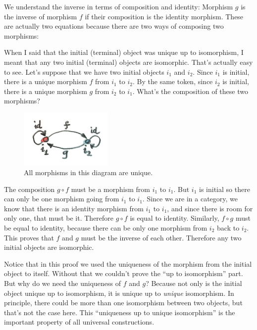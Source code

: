 We understand the inverse in terms of composition and identity: Morphism
$g$ is the inverse of morphism $f$ if their composition is the
identity morphism. These are actually two equations because there are
two ways of composing two morphisms:

When I said that the initial (terminal) object was unique up to
isomorphism, I meant that any two initial (terminal) objects are
isomorphic. That's actually easy to see. Let's suppose that we have two
initial objects $i_{1}$ and $i_{2}$. Since
$i_{1}$ is initial, there is a unique morphism $f$ from
$i_{1}$ to $i_{2}$. By the same token, since
$i_{2}$ is initial, there is a unique morphism $g$ from
$i_{2}$ to $i_{1}$. What's the composition of
these two morphisms?

\begin{figure}[H]
\centering
\includegraphics[width=0.4\textwidth]{images/uniqueness.jpg}
\caption{All morphisms in this diagram are unique.}
\end{figure}

\noindent
The composition $g \circ f$ must be a morphism from $i_{1}$ to
$i_{1}$. But $i_{1}$ is initial so there can only
be one morphism going from $i_{1}$ to $i_{1}$.
Since we are in a category, we know that there is an identity morphism
from $i_{1}$ to $i_{1}$, and since there is room
for only one, that must be it. Therefore $g \circ f$ is equal to
identity. Similarly, $f \circ g$ must be equal to identity, because there
can be only one morphism from $i_{2}$ back to
$i_{2}$. This proves that $f$ and $g$ must be the
inverse of each other. Therefore any two initial objects are isomorphic.

Notice that in this proof we used the uniqueness of the morphism from
the initial object to itself. Without that we couldn't prove the ``up to
isomorphism'' part. But why do we need the uniqueness of $f$ and
$g$? Because not only is the initial object unique up to
isomorphism, it is unique up to \emph{unique} isomorphism. In principle,
there could be more than one isomorphism between two objects, but that's
not the case here. This ``uniqueness up to unique isomorphism'' is the
important property of all universal constructions.


